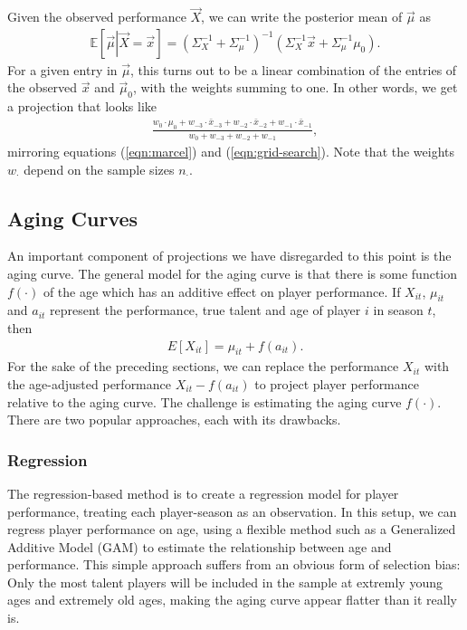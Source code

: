 \documentclass{article}
\begin{document}
      Given the observed performance $\vec X$, we can write the posterior mean of $\vec\mu$ as
      \begin{align*}
        \mathbb{E}\left[\vec\mu \left| \vec X = \vec x\right.\right] = \left(\Sigma_X^{-1} + \Sigma_\mu^{-1}\right)^{-1}\left(\Sigma_X^{-1}\vec x + \Sigma_\mu^{-1}\mu_0\right).
      \end{align*}
      For a given entry in $\vec\mu$, this turns out to be a linear combination of the entries of the observed $\vec x$ and $\vec\mu_0$, with the weights summing to one. In other words, we get a projection that looks like
      \begin{align*}
        \label{eqn:mvn-posterior}
        \frac
          {w_0 \cdot \mu_0 + w_{-3} \cdot \bar x_{-3} + w_{-2} \cdot \bar x_{-2} + w_{-1} \cdot \bar x_{-1}}
          {w_0 + w_{-3} + w_{-2} + w_{-1}},
      \end{align*}
      mirroring equations (\ref{eqn:marcel}) and (\ref{eqn:grid-search}). Note that the weights $w_\cdot$ depend on the sample sizes $n_\cdot$.
  
    \subsection{\sc Aging Curves}
  
      An important component of projections we have disregarded to this point is the aging curve. The general model for the aging curve is that there is some function $f(\cdot)$ of the age which has an additive effect on player performance. If $X_{it}$, $\mu_{it}$ and $a_{it}$ represent the performance, true talent and age of player $i$ in season $t$, then
      \begin{align*}
        E[X_{it}] = \mu_{it} + f(a_{it}).
      \end{align*}
      For the sake of the preceding sections, we can replace the performance $X_{it}$ with the age-adjusted performance $X_{it} - f(a_{it})$ to project player performance relative to the aging curve. The challenge is estimating the aging curve $f(\cdot)$. There are two popular approaches, each with its drawbacks.
  
      \subsubsection{\sc Regression}
  
        The regression-based method is to create a regression model for player performance, treating each player-season as an observation. In this setup, we can regress player performance on age, using a flexible method such as a Generalized Additive Model (GAM) to estimate the relationship between age and performance. This simple approach suffers from an obvious form of selection bias: Only the most talent players will be included in the sample at extremly young ages and extremely old ages, making the aging curve appear flatter than it really is.
  
\end{document}
